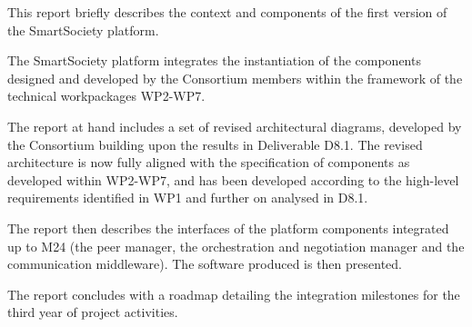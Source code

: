 This report briefly describes the context and components of the first version of the SmartSociety platform. 

The SmartSociety platform integrates the instantiation of the components designed and developed by the Consortium members within the framework of the technical workpackages WP2-WP7. 

The report at hand includes a set of revised architectural diagrams, developed by the Consortium building upon the results in Deliverable D8.1. The revised architecture is now fully aligned with the specification of components as developed within WP2-WP7, and has been developed according to the high-level requirements identified in WP1 and further on analysed in D8.1.

The report then describes the interfaces of the platform components integrated up to M24 (the peer manager, the orchestration and negotiation manager and the communication middleware). The software produced is then presented.

The report concludes with a roadmap detailing the integration milestones for the third year of project activities. 

